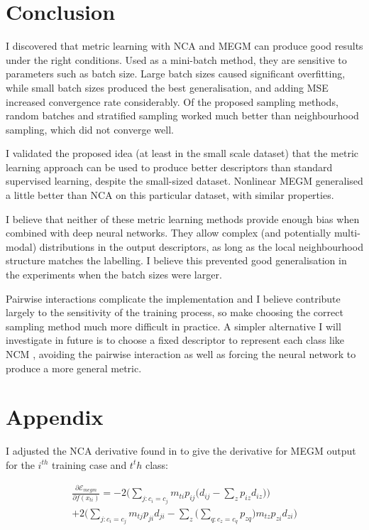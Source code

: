 \section {Conclusion}

I discovered that metric learning with \gls{NCA} and \gls{MEGM} can produce good results under the right conditions. Used as a mini-batch method, they are sensitive to parameters such as batch size. Large batch sizes caused significant overfitting, while small batch sizes produced the best generalisation, and adding \gls{MSE} increased convergence rate considerably. Of the proposed sampling methods, random batches and stratified sampling worked much better than neighbourhood sampling, which did not converge well.


I validated the proposed idea (at least in the small scale dataset) that the metric learning approach can be used to produce better descriptors than
standard supervised learning, despite the small-sized dataset. Nonlinear \gls{MEGM} generalised a little better than NCA on this particular dataset, with similar
properties.

I believe that neither of these metric learning methods provide enough bias when combined with deep neural networks. They allow
complex (and potentially multi-modal) distributions in the output descriptors, as long as the local neighbourhood structure matches the labelling. I believe this prevented good generalisation in the experiments when the batch sizes were larger.

Pairwise interactions complicate the implementation and I believe contribute largely to the sensitivity of the training process, so make choosing the correct sampling method much more difficult in practice. A simpler alternative I will investigate in future is to choose a fixed descriptor to represent each class like \gls{NCM} \cite {Mensink2012}, avoiding the pairwise interaction as well as forcing the neural network to produce a more general metric.



\section{Appendix}
\label{sec:appendix}

 I adjusted the \gls{NCA} derivative found in \cite {Salakhutdinov2007a} to give the derivative for \gls{MEGM} output for the $ i^{th} $ training case and $ t^th $ class:


\begin{multline}
\label{eq:megm_grad}
\frac{\partial \mathcal{E}_{megm}}{\partial f(x_{ti})} = 
  -2 \bigg( \sum_{j:c_i = c_j}  m_{ti} {p_{ij} \Big( d_{ij} - \sum_z{p_{iz}d_{iz}} \Big) } \bigg)\\
  +2 \bigg( \sum_{j:c_i = c_j} m_{tj}{p_{ji}d_{ji} - \sum_z{\Big( \sum_{q:c_z = c_q}{p_{zq}} \Big) m_{tz}p_{zi}d_{zi}   }} \bigg)
\end{multline}

